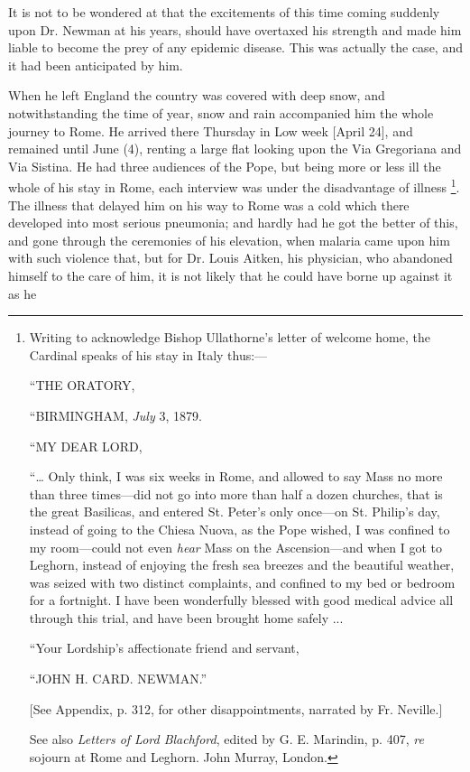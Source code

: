 It is not to be wondered at that the excitements of this time
coming suddenly upon Dr. Newman at his years, should have overtaxed
his strength and made him liable to become the prey of any
epidemic disease. This was actually the case, and it had been
anticipated by him.

When he left England the country was covered with deep snow, and
notwithstanding the time of year, snow and rain accompanied him the
whole journey to Rome. He arrived there Thursday in Low week [April
24], and remained until June (4), renting a large flat looking upon
the Via Gregoriana and Via Sistina. He had three audiences of the
Pope, but being more or less ill the whole of his stay in Rome, each
interview was under the disadvantage of illness \footnote{Writing to
acknowledge Bishop Ullathorne's letter of welcome home, the Cardinal
speaks of his stay in Italy thus:—

``THE ORATORY,

``BIRMINGHAM, \emph{July} 3, 1879.

``MY DEAR LORD,

``… Only think, I was six weeks in Rome, and allowed to say Mass
no more than three times—did not go into more than half a dozen
churches, that is the great Basilicas, and entered St. Peter's only
once—on St. Philip's day, instead of going to the Chiesa Nuova, as
the Pope wished, I was confined to my room—could not even \emph{hear}
Mass on the Ascension—and when I got to Leghorn, instead of enjoying
the fresh sea breezes and the beautiful weather, was seized with two
distinct complaints, and confined to my bed or bedroom for a
fortnight. I have been wonderfully blessed with good medical advice
all through this trial, and have been brought home safely ...

``Your Lordship's affectionate friend and servant,

``JOHN H. CARD. NEWMAN.''

[See Appendix, p. 312, for other disappointments, narrated by Fr.
Neville.]

See also \emph{Letters of Lord Blachford}, edited by G. E. Marindin,
p. 407, \emph{re} sojourn at Rome and Leghorn. John Murray, London.}. The illness that delayed him on his way to Rome was a cold
which there developed into most serious pneumonia; and hardly
had he got the better of this, and gone through the ceremonies of his
elevation, when malaria came upon him with such violence that, but for
Dr. Louis Aitken, his physician, who abandoned himself to the care of
him, it is not likely that he could have borne up against it as he
